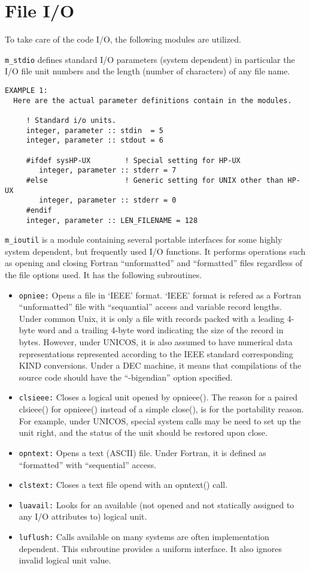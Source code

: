 \section{File I/O}
%
To take care of the code I/O, the following modules are utilized.

\noindent
{\tt m\_stdio} defines standard I/O parameters (system dependent) in 
particular the I/O file unit numbers and the length (number of characters)
 of any file name.
%
\begin{verbatim}
EXAMPLE 1:
  Here are the actual parameter definitions contain in the modules.

     ! Standard i/o units.
     integer, parameter :: stdin  = 5
     integer, parameter :: stdout = 6

     #ifdef sysHP-UX        ! Special setting for HP-UX
        integer, parameter :: stderr = 7
     #else                  ! Generic setting for UNIX other than HP-UX
        integer, parameter :: stderr = 0
     #endif
     integer, parameter :: LEN_FILENAME = 128
\end{verbatim}
%
{\tt m\_ioutil} is a module containing several portable interfaces for
some highly system dependent, but frequently used I/O functions.
It performs operations such as opening and closing Fortran ``unformatted''
and ``formatted'' files regardless of the file options used.
It has the following subroutines.
%
\begin{itemize}
\item {\tt opniee:} Opens a file in `IEEE' format.
  	`IEEE' format is refered as a Fortran ``unformatted'' file with
  	``sequantial'' access and variable record lengths. Under common
  	Unix, it is only a file with records packed with a leading 4-byte
  	word and a trailing 4-byte word indicating the size of the record 
        in bytes. However, under UNICOS, it is also assumed to have 
        numerical data representations represented according to the IEEE 
        standard corresponding KIND conversions. Under a DEC machine, it 
        means that compilations of the source code should have the 
       ``-bigendian'' option specified.
\item {\tt clsieee:} Closes a logical unit opened by opnieee().
  	The reason for a paired clsieee() for opnieee() instead of a
  	simple close(), is for the portability reason. For example,
  	under UNICOS, special system calls may be need to set up the
  	unit right, and the status of the unit should be restored upon
  	close.
\item {\tt opntext:} Opens a text (ASCII) file. Under Fortran, it is 
      defined as ``formatted'' with ``sequential'' access.
\item {\tt clstext:} Closes a text file opend with an opntext() call.
\item {\tt luavail:} Looks for an available (not opened and not statically
      assigned to any I/O attributes to) logical unit.
\item {\tt luflush:} Calls available on many systems are often implementation
      dependent. This subroutine provides a uniform interface. It also 
      ignores invalid logical unit value. 
\end{itemize}

